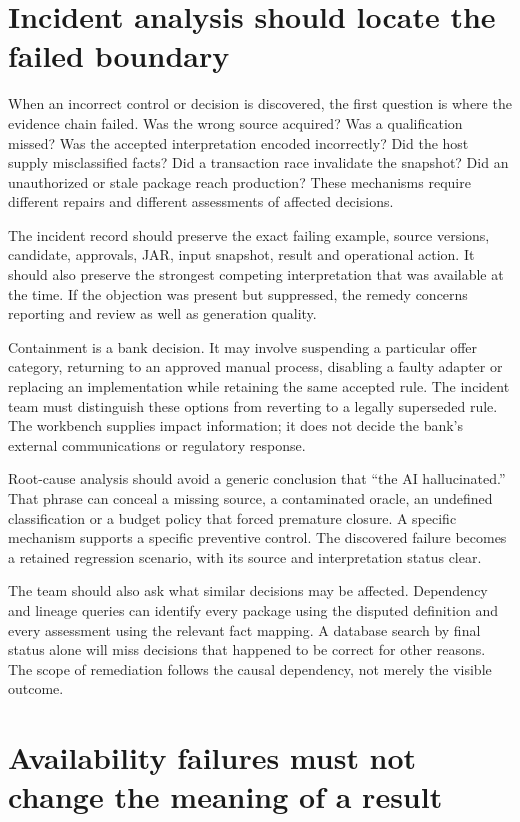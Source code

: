 \section{Incident analysis should locate the failed boundary}

When an incorrect control or decision is discovered, the first question is where
the evidence chain failed. Was the wrong source acquired? Was a qualification
missed? Was the accepted interpretation encoded incorrectly? Did the host supply
misclassified facts? Did a transaction race invalidate the snapshot? Did an
unauthorized or stale package reach production? These mechanisms require different
repairs and different assessments of affected decisions.

The incident record should preserve the exact failing example, source versions,
candidate, approvals, JAR, input snapshot, result and operational action. It
should also preserve the strongest competing interpretation that was available
at the time. If the objection was present but suppressed, the remedy concerns
reporting and review as well as generation quality.

Containment is a bank decision. It may involve suspending a particular offer
category, returning to an approved manual process, disabling a faulty adapter or
replacing an implementation while retaining the same accepted rule. The incident
team must distinguish these options from reverting to a legally superseded rule.
The workbench supplies impact information; it does not decide the bank's external
communications or regulatory response.

Root-cause analysis should avoid a generic conclusion that ``the AI hallucinated.''
That phrase can conceal a missing source, a contaminated oracle, an undefined
classification or a budget policy that forced premature closure. A specific
mechanism supports a specific preventive control. The discovered failure becomes
a retained regression scenario, with its source and interpretation status clear.

The team should also ask what similar decisions may be affected. Dependency and
lineage queries can identify every package using the disputed definition and
every assessment using the relevant fact mapping. A database search by final
status alone will miss decisions that happened to be correct for other reasons.
The scope of remediation follows the causal dependency, not merely the visible
outcome.

\section{Availability failures must not change the meaning of a result}


